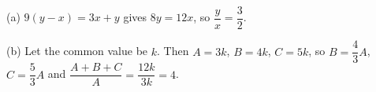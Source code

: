 (a) $9(y-x)=3x+y$ gives $8y=12x$, so $\dfrac yx=\boxed{\dfrac32}$.

(b) Let the common value be $k$. Then $A=3k$, $B=4k$, $C=5k$, so $B=\dfrac43A$, $C=\dfrac53A$ and $\dfrac{A+B+C}A=\dfrac{12k}{3k}=\boxed{4}$.
